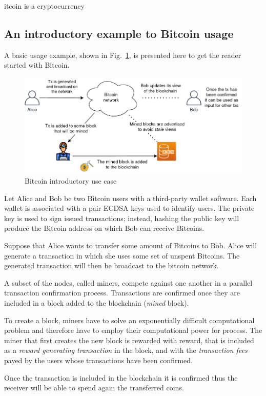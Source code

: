 \documentclass[12pt, letterpaper, twoside]{article}
\begin{document}
itcoin is a cryptocurrency


\subsection{An introductory example to Bitcoin usage}\label{sec:useexample}
A basic usage example, shown in Fig.~\ref{fig:basicexample}, is presented here to get the reader started with Bitcoin.

\begin{figure}[h!]
	\includegraphics[width=.90\textwidth]{pict/basicexample.png}
	\centering
	\caption{Bitcoin introductory use case}
	\label{fig:basicexample}
\end{figure}

Let Alice and Bob be two Bitcoin users with a third-party wallet software. Each wallet is associated with a pair ECDSA keys used to identify users. The private key is used to sign issued transactions; instead, hashing the public key will produce the Bitcoin address on which Bob can receive Bitcoins. 

Suppose that Alice wants to transfer some amount of Bitcoins to Bob. Alice will generate a transaction in which she uses some set of unspent Bitcoins. The generated transaction will then be broadcast to the bitcoin network.

A subset of the nodes, called miners, compete against one another in a parallel transaction confirmation process. Transactions are confirmed once they are included in a block added to the blockchain (\emph{mined} block).

To create a block, miners have to solve an exponentially difficult computational problem and therefore have to employ their computational power for process. The miner that first creates the new block is rewarded with reward, that is included as a \emph{reward generating transaction} in the block, and with the \emph{transaction fees} payed by the users whose transactions have been confirmed.

Once the transaction is included in the blockchain it is confirmed thus the receiver will be able to spend again the transferred coins.
\end{document}
